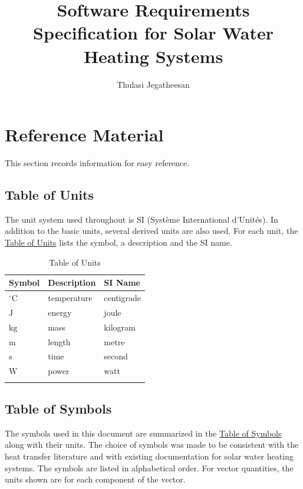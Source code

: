 \documentclass[12pt]{article}
\title{Software Requirements Specification for Solar Water Heating Systems}
\author{Thulasi Jegatheesan}
\begin{document}
\maketitle
\tableofcontents
\newpage
\section{Reference Material}
\label{Sec:RefMat}
This section records information for easy reference.

\subsection{Table of Units}
\label{Sec:ToU}
The unit system used throughout is SI (Système International d'Unités). In addition to the basic units, several derived units are also used. For each unit, the \hyperref[Table:ToU]{Table of Units} lists the symbol, a description and the SI name.

\begin{longtable}{l l l}
\toprule
\textbf{Symbol} & \textbf{Description} & \textbf{SI Name}
\\
\midrule
\endhead
${{}^{\circ}\text{C}}$ & temperature & centigrade
\\
${\text{J}}$ & energy & joule
\\
${\text{kg}}$ & mass & kilogram
\\
${\text{m}}$ & length & metre
\\
${\text{s}}$ & time & second
\\
${\text{W}}$ & power & watt
\\
\bottomrule
\caption{Table of Units}
\label{Table:ToU}
\end{longtable}
\subsection{Table of Symbols}
\label{Sec:ToS}
The symbols used in this document are summarized in the \hyperref[Table:ToS]{Table of Symbols} along with their units. The choice of symbols was made to be consistent with the heat transfer literature and with existing documentation for solar water heating systems. The symbols are listed in alphabetical order. For vector quantities, the units shown are for each component of the vector.
\end{document}
